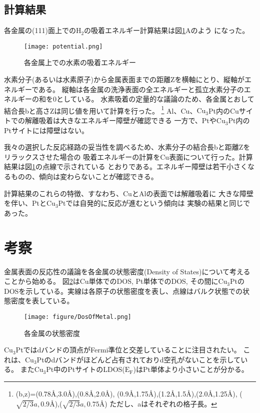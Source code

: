 \documentclass[12pt]{ltjsarticle}
\begin{document}
\subsection{計算結果}
各金属の(111)面上での$\text{H}_\text{2}$の吸着エネルギー計算結果は図\ref{fig:potential}Aのよう
になった。\\
\begin{figure}[hbtp]
    \begin{center}
     \texttt{[image: potential.png]}
    \end{center}
    \caption{各金属上での水素の吸着エネルギー}
    \label{fig:potential}
\end{figure}
水素分子(あるいは水素原子)から金属表面までの距離Zを横軸にとり、縦軸がエネルギーである。
縦軸は各金属の洗浄表面の全エネルギーと孤立水素分子のエネルギーの和を0としている。
水素吸着の定量的な議論のため、各金属とおして結合長bと高さZは同じ値を用いて計算を行った。
\footnote{(b,z)=(0.78$\mbox{\AA}$,3.0$\mbox{\AA}$),(0.8$\mbox{\AA}$,2.0$\mbox{\AA}$),
(0.9$\mbox{\AA}$,1.75$\mbox{\AA}$),(1.2$\mbox{\AA}$,1.5$\mbox{\AA}$),(2.0$\mbox{\AA}$,1.25$\mbox{\AA}$),
($\sqrt{2/3}a,0.9\mbox{\AA}$),($\sqrt{2/3}a,0.75\mbox{\AA}$) ただし、aはそれぞれの格子長。}
Al、Cu、$\text{Cu}_\text{3}$Pt内のCuサイトでの解離吸着は大きなエネルギー障壁が確認できる
一方で、Ptや$\text{Cu}_\text{3}$Pt内のPtサイトには障壁はない。

我々の選択した反応経路の妥当性を調べるため、水素分子の結合長bと距離Zをリラックスさせた場合の
吸着エネルギーの計算をCu表面について行った。計算結果は図\ref{fig:potential}の点線で示されている
とおりである。エネルギー障壁は若干小さくなるものの、傾向は変わらないことが確認できる。

計算結果のこれらの特徴、すなわち、CuとAlの表面では解離吸着に
大きな障壁を伴い、Ptと$\text{Cu}_\text{3}$Ptでは自発的に反応が進むという傾向は
実験の結果と同じであった。

\section{考察}

金属表面の反応性の議論を各金属の状態密度(Density of States)について考えることから始める。
図\ref{fig:dosmetal}はCu単体でのDOS, Pt単体でのDOS, その間に$\text{Cu}_\text{3}$Ptの
DOSを示している。実線は各原子の状態密度を表し、点線はバルク状態での状態密度を表している。
\begin{figure}[hbtp]
    \begin{center}
     \texttt{[image: figure/DosOfMetal.png]}
    \end{center}
    \caption{各金属の状態密度}
    \label{fig:dosmetal}
\end{figure}
$\text{Cu}_\text{3}$Ptではdバンドの頂点がFermi準位と交差していることに注目されたい。
これは、$\text{Cu}_\text{3}$Ptのdバンドがほどんど占有されておりd空孔がないことを示している。
また$\text{Cu}_\text{3}$Pt中のPtサイトのLDOS($\text{E}_\text{F}$)はPt単体より小さいことが分かる。
\end{document}
